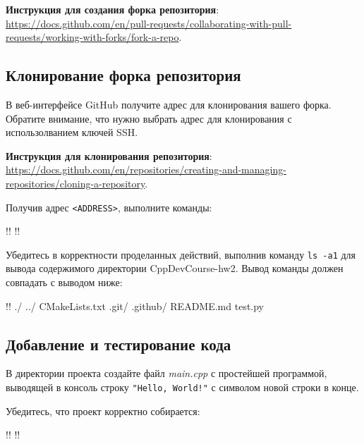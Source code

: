 \documentclass[14pt]{extarticle}
\begin{document}
    \begin{tcolorbox}
        \textbf{Инструкция для создания форка репозитория}: \\
        \url{https://docs.github.com/en/pull-requests/collaborating-with-pull-requests/working-with-forks/fork-a-repo}.
    \end{tcolorbox}

    \subsection{Клонирование форка репозитория}

    В веб-интерфейсе GitHub получите адрес для клонирования вашего форка.
    Обратите внимание, что нужно выбрать адрес для клонирования с использолванием
    ключей SSH.

    \begin{tcolorbox}
        \textbf{Инструкция для клонирования репозитория}: \\
        \url{https://docs.github.com/en/repositories/creating-and-managing-repositories/cloning-a-repository}.
    \end{tcolorbox}

    Получив адрес \verb|<ADDRESS>|, выполните команды:

    \begin{terminalwindow}
!!
!!
    \end{terminalwindow}

    Убедитесь в корректности проделанных действий, выполнив команду \verb|ls -a1|
    для вывода содержимого директории CppDevCourse-hw2.
    Вывод команды должен совпадать с выводом ниже:

    \begin{terminalwindow}
!!
./
../
CMakeLists.txt
.git/
.github/
README.md
test.py
    \end{terminalwindow}

    \subsection{Добавление и тестирование кода}

    В директории проекта создайте файл \textit{main.cpp} с простейшей программой,
    выводящей в консоль строку \verb|"Hello, World!"| с символом новой строки в конце.

    Убедитесь, что проект корректно собирается:

    \begin{terminalwindow}
!!
!!
    \end{terminalwindow}
\end{document}
